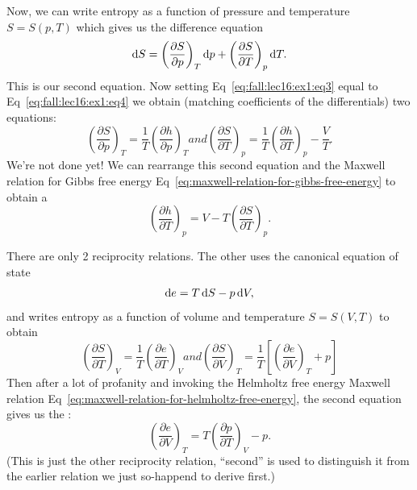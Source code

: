 \begin{example}
Now, we can write entropy as a function of pressure and temperature $S=S(p,T)$
which gives us the difference equation
\begin{equation}\label{eq:fall:lec16:ex1:eq4}
\mathrm{d} S = \left(\frac{\partial S}{\partial p}\right)_{T}\mathrm{d} p
+ \left(\frac{\partial S}{\partial T}\right)_{p}\mathrm{d} T.
\end{equation}
This is our second equation. Now setting Eq~\eqref{eq:fall:lec16:ex1:eq3}
equal to Eq~\eqref{eq:fall:lec16:ex1:eq4} we obtain (matching
coefficients of the differentials) two equations:
\begin{subequations}
\begin{equation}
\left(\frac{\partial S}{\partial p}\right)_{T} = \frac{1}{T}\left(\frac{\partial h}{\partial p}\right)_{T}
\end{equation}
and
\begin{equation}
\left(\frac{\partial S}{\partial T}\right)_{p}
=\frac{1}{T}\left(\frac{\partial h}{\partial T}\right)_{p}-\frac{V}{T}.
\end{equation}
\end{subequations}
We're not done yet! We can rearrange this second equation and the
Maxwell relation for Gibbs free energy Eq~\eqref{eq:maxwell-relation-for-gibbs-free-energy} to obtain a
\begin{equation}
\boxed{\left(\frac{\partial h}{\partial T}\right)_{p}=V-T\left(\frac{\partial S}{\partial T}\right)_{p}.}
\end{equation}
\end{example}

\begin{node}
There are only 2 reciprocity relations. The other uses the canonical
equation of state
\begin{equation}
\mathrm{d} e = T\,\mathrm{d} S - p\,\mathrm{d} V,
\end{equation}
and writes entropy as a function of volume and temperature $S=S(V,T)$
to obtain
\begin{subequations}
\begin{equation}
  \left(\frac{\partial S}{\partial T}\right)_{V}=
  \frac{1}{T}\left(\frac{\partial e}{\partial T}\right)_{V}
\end{equation}
and
\begin{equation}
\left(\frac{\partial S}{\partial V}\right)_{T} =
\frac{1}{T}\left[\left(\frac{\partial e}{\partial V}\right)_{T} + p\right]
\end{equation}
\end{subequations}
Then after a lot of profanity and invoking the Helmholtz free energy
Maxwell relation Eq~\eqref{eq:maxwell-relation-for-helmholtz-free-energy}, the
second equation gives us the :
\begin{equation}\label{eq:second-reciprocity}
\boxed{\left(\frac{\partial e}{\partial V}\right)_{T} = T\left(\frac{\partial p}{\partial T}\right)_{V}-p.}
\end{equation}
(This is just the other reciprocity relation, ``second'' is used to
distinguish it from the earlier relation we just so-happend to derive first.)
\end{node}

